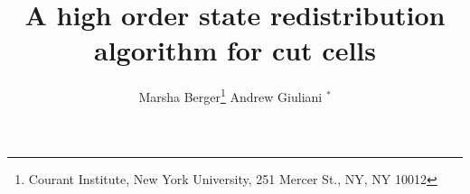 \documentclass[12pt]{article}
\begin{document}
\title{A high order state redistribution algorithm for cut cells}
\author{Marsha Berger\footnote{Courant Institute, New York University, 251 Mercer St.,
NY, NY 10012}  \hspace{1in} Andrew Giuliani $^*$}

\maketitle

\begin{abstract}
\end{abstract}















\end{document}
